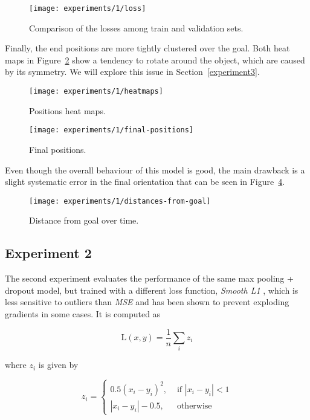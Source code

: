 \begin{figure}[htbp]
\centerline{\texttt{[image: experiments/1/loss]}}
	\caption{Comparison of the losses among train and validation sets.}
	\label{fig:loss}
\end{figure}

Finally, the end positions are more tightly clustered over the goal.
Both heat maps in Figure~\ref{fig:heatmaps} show a tendency to rotate around 
the object, which are caused by its symmetry. We will explore this issue in 
Section~\ref{experiment3}.

\begin{figure}[htbp]
	\centerline{\texttt{[image: experiments/1/heatmaps]}}
	\caption{Positions heat maps.}
	\label{fig:heatmaps}
\end{figure}

\begin{figure}[htbp]
	\centerline{\texttt{[image: experiments/1/final-positions]}}
	\caption{Final positions.}
	\label{fig:final-positions}
\end{figure}

Even though the overall behaviour of this model is good, the main drawback is a 
slight systematic error in the final orientation that can be seen in 
Figure~\ref{fig:distance-from-goal-learned}.

\begin{figure}[htbp]
	\centerline{\texttt{[image: experiments/1/distances-from-goal]}}
	\caption{Distance from goal over time.}
	\label{fig:distance-from-goal-learned}
\end{figure}

\subsection{Experiment 2}
The second experiment evaluates the performance of the same max pooling + 
dropout model, but trained with a different loss function, \emph{Smooth 
L1} \cite{smoothl1}, which is less sensitive to outliers than \emph{MSE} and 
has been shown to prevent exploding gradients in some cases. It is computed as

\begin{equation}
\text{L}(x, y) = \frac{1}{n}\sum_{i}z_i
\label{smoothl1}
\end{equation}

where $z_i$ is given by

\begin{equation}
z_i = 
\begin{cases}
0.5 (x_i-y_i)^2, &\text{ if } |x_i-y_i|<1 \\
|x_i-y_i| - 0.5, &\text{ otherwise}
\end{cases}
\end{equation}

